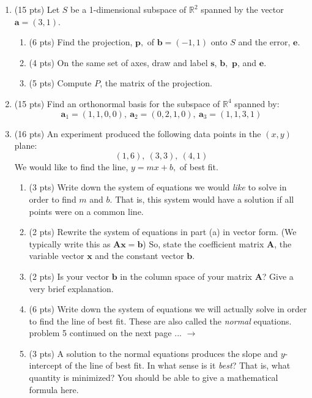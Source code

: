 \documentclass[11pt]{amsart}
\newcommand{\ba}{\mathbf{a}}
\newcommand{\bb}{\mathbf{b}}
\newcommand{\bd}{\mathbf{d}}
\newcommand{\be}{\mathbf{e}}
\newcommand{\bp}{\mathbf{p}}
\newcommand{\bs}{\mathbf{s}}
\newcommand{\bx}{\mathbf{x}}
\newcommand{\bA}{\mathbf{A}}
\begin{document}
\begin{enumerate}
Here is the row-reduced echelon form of the augmented matrix:
    $$[A\,\,\,\bb] \qquad \longrightarrow \qquad
    [R\,\,\,\bd] = \begin{bmatrix} 1 & 0 & 0 & 1/2 & 3 \\ 
    0 & 1 & 0 & 1/3 & 4\\
    0&0&1&0&-3 \end{bmatrix}$$
What is the general solution of the system?  Show your work.
\vfill
\newpage
\item (15 pts) Let $S$ be a 1-dimensional subspace of $\mathbb{R}^2$ spanned by the vector $\ba=(3,1).$  	\begin{enumerate}
	\item (6 pts) Find the projection, $\bp,$ of $\bb=(-1,1)$ onto $S$ and the error, $\be.$
	\vfill
	\item  (4 pts) On the same set of axes, draw and label $\bs$, $\bb,$ $\bp$, and $\be.$
	\vfill
	\item (5 pts) Compute $P$, the matrix of the projection. 
	\vfill
	\end{enumerate}
\newpage
\item (15 pts) Find an orthonormal basis for the subspace of $\mathbb{R}^4$ spanned by:
$$\ba_1=(1,1,0,0),\: \ba_2=(0,2,1,0),\: \ba_3=(1,1,3,1)$$
\vfill
\newpage
\item (16 pts) An experiment produced the following data points in the $(x,y)$ plane:
$$(1,6),\: (3, 3), \: (4,1)$$
We would like to find the line, $y=mx+b,$ of best fit.
	\begin{enumerate}
	\item (3 pts) Write down the system of equations we would \emph{like} to solve in order to find $m$ and $b$. That is, this system would have a solution if all points were on a common line.
	\vfill
	\item (2 pts) Rewrite the system of equations in part (a) in vector form. (We typically write this as $\bA \bx = \bb$) So,  state the coefficient matrix $\bA$, the variable vector $\bx$ and the constant vector $\bb.$
	\vfill
	\item (2 pts) Is your vector $\bb$ in the column space of your matrix $\bA$? Give a very brief explanation.
	\vskip 0.5in 
	\item (6 pts) Write down the system of equations we will actually solve in order to find the line of best fit. These are also called the \emph{normal} equations. 
	\vfill
	\vfill
	\quad \hfill problem 5 continued on the next page ... $\longrightarrow$
	\newpage
	\item (3 pts) A solution to the normal equations produces the slope and $y$-intercept of the line of best fit. In what sense is it \emph{best}? That is, what quantity is minimized? You should be able to give a mathematical formula here.

\end{enumerate}
\end{enumerate}
\end{document}
